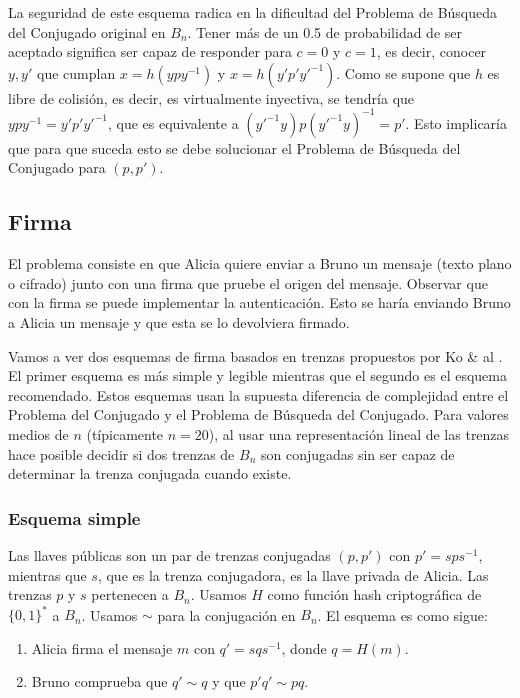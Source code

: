 \documentclass[12pt]{book}
\theoremstyle{definition}
\begin{document}
La seguridad de este esquema radica en la dificultad del Problema de Búsqueda del Conjugado original en $B_n$. Tener más de un 0.5 de probabilidad de ser aceptado significa ser capaz de responder para $c=0$ y $c=1$, es decir, conocer $y,y'$ que cumplan $x=h(ypy^{-1})$ y $x=h(y'p'y'^{-1})$. Como se supone que $h$ es libre de colisión, es decir, es virtualmente inyectiva, se tendría que $ypy^{-1}=y'p'y'^{-1}$, que es equivalente a $(y'^{-1}y)p(y'^{-1}y)^{-1}=p'$. Esto implicaría que para que suceda esto se debe solucionar el Problema de Búsqueda del Conjugado para $(p,p')$.

\subsection{Firma}
El problema consiste en que Alicia quiere enviar a Bruno un mensaje (texto plano o cifrado) junto con una firma que pruebe el origen del mensaje. Observar que con la firma se puede implementar la autenticación. Esto se haría enviando Bruno a Alicia un mensaje y que esta se lo devolviera firmado.

Vamos a ver dos esquemas de firma basados en trenzas propuestos por Ko \& al \cite{Ko_sig}. El primer esquema es más simple y legible mientras que el segundo es el esquema recomendado. Estos esquemas usan la supuesta diferencia de complejidad entre el Problema del Conjugado y el Problema de Búsqueda del Conjugado. Para valores medios de $n$ (típicamente $n=20$), al usar una representación lineal de las trenzas hace posible decidir si dos trenzas de $B_n$ son conjugadas sin ser capaz de determinar la trenza conjugada cuando existe.

\subsubsection*{Esquema simple}
Las llaves públicas son un par de trenzas conjugadas $(p,p')$ con $p'=sps^{-1}$, mientras que $s$, que es la trenza conjugadora, es la llave privada de Alicia. Las trenzas $p$ y $s$ pertenecen a $B_n$. Usamos $H$ como función hash criptográfica de $\{0,1\}^*$ a $B_n$. Usamos $\sim$ para la conjugación en $B_n$. El esquema es como sigue:


\begin{enumerate}
\item Alicia firma el mensaje $m$ con $q'=sqs^{-1}$, donde $q=H(m)$.
\item Bruno comprueba que $q'\sim q$ y que $p'q'\sim pq$.
\end{enumerate}
\end{document}
